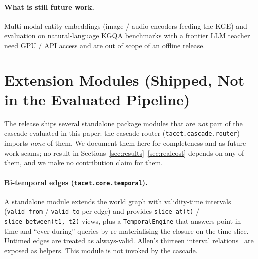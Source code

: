 \documentclass[11pt]{article}
\theoremstyle{plain}
\begin{document}
\paragraph{What is still future work.}
Multi-modal entity embeddings (image / audio encoders feeding the KGE) and
evaluation on natural-language KGQA benchmarks with a frontier LLM
teacher need GPU / API access and are out of scope of an offline release.

\section{Extension Modules (Shipped, Not in the Evaluated Pipeline)}
\label{sec:extmodules}

The release ships several standalone package modules that are \emph{not}
part of the cascade evaluated in this paper: the cascade router
(\texttt{tacet.cascade.router}) imports \emph{none} of them. We document them
here for completeness and as future-work seams; no result in
Sections~\ref{sec:results}--\ref{sec:realcost} depends on any of them, and we
make no contribution claim for them.

\paragraph{Bi-temporal edges (\texttt{tacet.core.temporal}).}
A standalone module extends the world graph with validity-time intervals
(\texttt{valid\_from} / \texttt{valid\_to} per edge) and provides
\texttt{slice\_at(t)} / \texttt{slice\_between(t1, t2)} views, plus a
\texttt{TemporalEngine} that answers point-in-time and ``ever-during'' queries
by re-materialising the closure on the time slice. Untimed edges are treated
as always-valid. Allen's thirteen interval
relations~\citep{allen1983temporal} are exposed as helpers. This module is not
invoked by the cascade.
\end{document}
